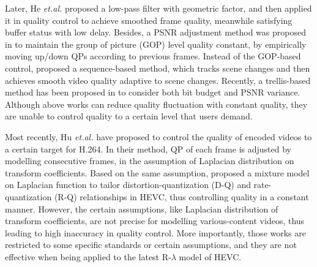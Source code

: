 \documentclass[smallabstract,smallcaptions]{dccpaper}
\begin{document}
Later, He \emph{et.al.} \cite{he2005low} proposed a low-pass filter with geometric factor, and then applied it in quality control to achieve smoothed frame quality, meanwhile satisfying buffer status with low delay. Besides, a PSNR adjustment method was proposed in \cite{de2005psnr} to maintain the group of picture (GOP) level quality constant, by empirically moving up/down QPs according to previous frames. Instead of the GOP-based control, \cite{xie2006sequence} proposed a sequence-based method, which tracks scene changes and then achieves smooth video quality adaptive to scene changes. Recently, a trellis-based method has been proposed in \cite{huang2009consistent} to consider both bit budget and PSNR variance. Although above works can reduce quality fluctuation with constant quality, they are unable to control quality to a certain level that users demand.




Most recently, Hu \emph{et.al.} \cite{hu2012adaptive} have proposed to control the quality of encoded videos to a certain target for H.264. In their method, QP of each frame is adjusted by modelling consecutive frames, in the assumption of Laplacian distribution on transform coefficients. Based on the same assumption, \cite{seo2013rate} proposed a mixture model on Laplacian function to tailor distortion-quantization (D-Q) and rate-quantization (R-Q) relationships in HEVC, thus controlling quality in a constant manner. However, the certain assumptions, like Laplacian distribution of transform coefficients, are not precise for modelling various-content videos, thus leading to high inaccuracy in quality control. More importantly, those works are restricted to some specific standards or certain assumptions, and they are not effective when being applied to the latest R-$\lambda$ model \cite{li2016optimal} of HEVC.
\end{document}
